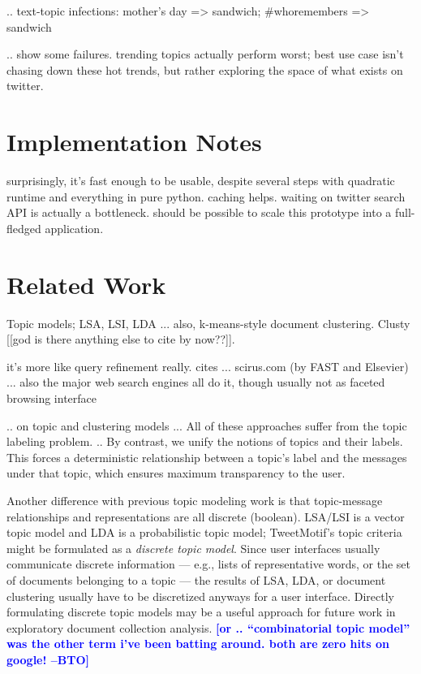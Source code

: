 \documentclass[letterpaper]{article}
\newcommand{\bto}[1]{\textcolor{blue}{\textbf{[#1 --BTO]}}}
\begin{document}
.. text-topic infections: mother's day => sandwich; \#whoremembers => sandwich

.. show some failures.  trending topics actually perform worst; best use case isn't chasing down these hot trends, but rather exploring the space of what exists on twitter.

\section{Implementation Notes}

surprisingly, it's fast enough to be usable, despite several steps with quadratic runtime and everything in pure python.  caching helps.  waiting on twitter search API is actually a bottleneck.  should be possible to scale this prototype into a full-fledged application.

\section{Related Work}

Topic models; LSA, LSI, LDA ... also, k-means-style document clustering.  Clusty [[god is there anything else to cite by now??]].

it's more like query refinement really.  cites ... scirus.com (by FAST and Elsevier)  ... also the major web search engines all do it, though usually not as faceted browsing interface

.. on topic and clustering models ... All of these approaches suffer from the topic labeling problem. ..  By contrast, we unify the notions of topics and their labels.  This forces a deterministic relationship between a topic's label and the messages under that topic, which ensures maximum transparency to the user.

Another difference with previous topic modeling work is that topic-message relationships and representations are all discrete (boolean).  LSA/LSI is a vector topic model and LDA is a probabilistic topic model; TweetMotif's topic criteria might be formulated as a \emph{discrete topic model}.  Since user interfaces usually communicate discrete information --- e.g., lists of representative words, or the set of documents belonging to a topic --- the results of LSA, LDA, or document clustering usually have to be discretized anyways for a user interface.  Directly formulating discrete topic models may be a useful approach for future work in exploratory document collection analysis.  \bto{or .. ``combinatorial topic model'' was the other term i've been batting around.  both are zero hits on google!}




\end{document}
